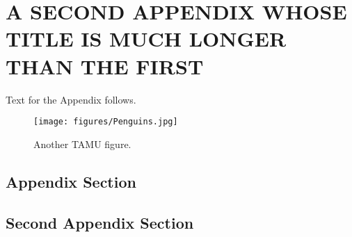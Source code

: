 %
%
%
%


\chapter{\uppercase {A Second Appendix Whose Title Is Much Longer Than The First}}

Text for the Appendix follows.

\begin{figure}[h]
\centering
\texttt{[image: figures/Penguins.jpg]}
\caption{Another TAMU figure.}
\label{fig:tamu-fig6}
\end{figure}

\section{Appendix Section}

\section{Second Appendix Section}


\pagebreak{}
